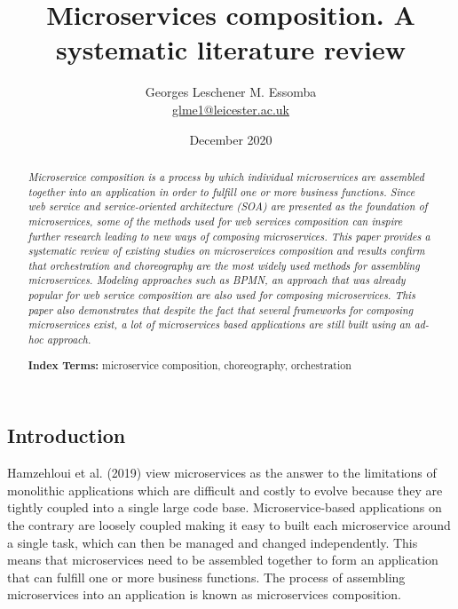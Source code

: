\documentclass{article}
\begin{document}
\author{Georges Leschener M. Essomba \\ \href{mailto:glme1@leicester.ac.uk}{glme1@leicester.ac.uk} }
\title{Microservices composition. A systematic literature review}
\date{December 2020} %

\maketitle{} %

\pagebreak %
\tableofcontents %
\listoffigures
\listoftables
\pagebreak %

\renewcommand*\abstractname{\flushleft\textbf{Abstract}\hfill}
\begin{multicols}{2}
\begin{abstract}
\emph{Microservice composition is a process by which individual microservices are assembled together into an application in order to fulfill one or more business functions. Since web service and service-oriented architecture (SOA) are presented as the foundation of microservices, some of the methods used for web services composition can inspire further research leading to new ways of composing microservices. This paper provides a systematic review of existing studies on microservices composition and results confirm that orchestration and choreography are the most widely used methods for assembling microservices. Modeling approaches such as BPMN, an approach that was already popular for web service composition are also used for composing microservices. This paper also demonstrates that despite the fact that several frameworks for composing microservices exist, a lot of microservices based applications are still built using an ad-hoc approach.}

\textbf{Index Terms:} microservice composition, choreography, orchestration

\noindent 


\end{abstract}

\section{Introduction}
Hamzehloui et al. (2019) view microservices as the answer to the limitations of monolithic applications which are difficult and costly to evolve because they are tightly coupled into a single large code base. Microservice-based applications on the contrary are loosely coupled making it easy to built each microservice around a single task, which can then be managed and changed independently. This means that microservices need to be assembled together to form an application that can fulfill one or more business functions. The process of assembling microservices into an application is known as microservices composition. 


\end{multicols}
\end{document}

